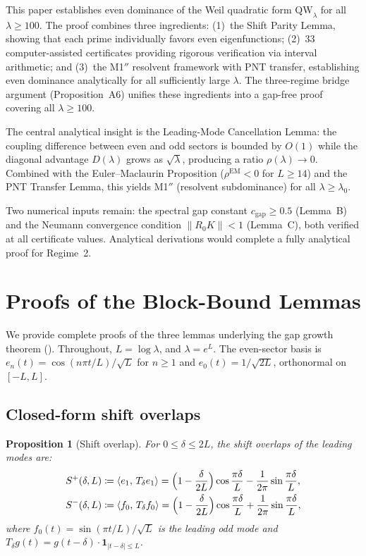 \documentclass[12pt,a4paper]{article}
\newtheorem{proposition}[theorem]{Proposition}
\theoremstyle{definition}
\theoremstyle{remark}
\begin{document}
This paper establishes even dominance of the Weil quadratic form $\mathrm{QW}_\lambda$ for all $\lambda \geq 100$. The proof combines three ingredients: (1)~the Shift Parity Lemma, showing that each prime individually favors even eigenfunctions; (2)~33 computer-assisted certificates providing rigorous verification via interval arithmetic; and (3)~the M1$''$ resolvent framework with PNT transfer, establishing even dominance analytically for all sufficiently large $\lambda$. The three-regime bridge argument (Proposition~A6) unifies these ingredients into a gap-free proof covering all $\lambda \geq 100$.

The central analytical insight is the Leading-Mode Cancellation Lemma: the coupling difference between even and odd sectors is bounded by $O(1)$ while the diagonal advantage $D(\lambda)$ grows as $\sqrt{\lambda}$, producing a ratio $\rho(\lambda) \to 0$. Combined with the Euler--Maclaurin Proposition ($\rho^{\mathrm{EM}} < 0$ for $L \geq 14$) and the PNT Transfer Lemma, this yields M1$''$ (resolvent subdominance) for all $\lambda \geq \lambda_0$.

Two numerical inputs remain: the spectral gap constant $c_{\mathrm{gap}} \geq 0.5$ (Lemma~B) and the Neumann convergence condition $\|R_0 K\| < 1$ (Lemma~C), both verified at all certificate values. Analytical derivations would complete a fully analytical proof for Regime~2.

\appendix
\section{Proofs of the Block-Bound Lemmas}
\label{app:block-proofs}

We provide complete proofs of the three lemmas underlying the gap growth theorem (). Throughout, $L = \log\lambda$, and $\lambda = e^L$. The even-sector basis is $e_n(t) = \cos(n\pi t/L)/\sqrt{L}$ for $n \geq 1$ and $e_0(t) = 1/\sqrt{2L}$, orthonormal on $[-L, L]$.

\subsection{Closed-form shift overlaps}

\begin{proposition}[Shift overlap]
\label{prop:overlap-closed}
For $0 \leq \delta \leq 2L$, the shift overlaps of the leading modes are:
\begin{align}
  S^+(\delta, L) &\coloneqq \langle e_1,\, T_\delta e_1\rangle = \Bigl(1 - \frac{\delta}{2L}\Bigr)\cos\frac{\pi\delta}{L} - \frac{1}{2\pi}\sin\frac{\pi\delta}{L}, \label{eq:Scos} \\
  S^-(\delta, L) &\coloneqq \langle f_0,\, T_\delta f_0\rangle = \Bigl(1 - \frac{\delta}{2L}\Bigr)\cos\frac{\pi\delta}{L} + \frac{1}{2\pi}\sin\frac{\pi\delta}{L}, \label{eq:Ssin}
\end{align}
where $f_0(t) = \sin(\pi t/L)/\sqrt{L}$ is the leading odd mode and $T_\delta g(t) = g(t - \delta)\cdot\mathbf{1}_{|t-\delta|\leq L}$.
\end{proposition}
\end{document}
